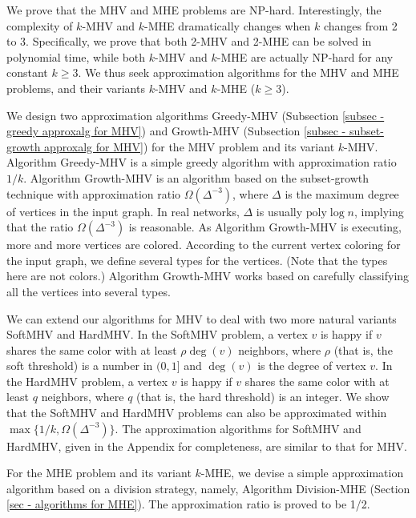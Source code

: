 \documentclass[11pt]{article}
\begin{document}
We prove that the MHV and MHE problems are NP-hard. Interestingly, the
complexity of $k$-MHV and $k$-MHE dramatically changes when $k$ changes
from 2 to 3. Specifically, we prove that both 2-MHV and 2-MHE can be solved
in polynomial time, while both $k$-MHV and $k$-MHE are actually NP-hard for
any constant $k \geq 3$. We thus seek approximation algorithms for the MHV
and MHE problems, and their variants $k$-MHV and $k$-MHE ($k \geq 3$).

We design two approximation algorithms
{\sc Greedy-MHV} (Subsection \ref{subsec - greedy approxalg for MHV}) and
{\sc Growth-MHV} (Subsection \ref{subsec - subset-growth approxalg for MHV})
for the MHV problem and its variant $k$-MHV.
Algorithm {\sc Greedy-MHV} is a simple greedy algorithm with approximation
ratio $1/k$. Algorithm {\sc Growth-MHV} is an algorithm based on the
subset-growth technique with approximation ratio $\Omega(\Delta^{-3})$,
where $\Delta$ is the maximum degree of vertices in the input graph.
In real networks, $\Delta$ is usually $\mbox{poly} \log n$, implying that
the ratio $\Omega(\Delta^{-3})$ is reasonable.
As Algorithm {\sc Growth-MHV} is executing, more and more vertices are
colored. According to the current vertex coloring for the input graph,
we define several types for the vertices. (Note that the types here are not
colors.) Algorithm {\sc Growth-MHV} works based on carefully classifying
all the vertices into several types.

We can extend our algorithms for MHV to deal with two more natural variants
SoftMHV and HardMHV.
In the SoftMHV problem, a vertex $v$ is happy if $v$ shares the same color with
at least $\rho \deg(v)$ neighbors, where $\rho$ (that is, the soft threshold)
is a number in $(0, 1]$ and $\deg(v)$ is the degree of vertex $v$.
In the HardMHV problem, a vertex $v$ is happy if $v$ shares the same color with
at least $q$ neighbors, where $q$ (that is, the hard threshold) is an integer.
We show that the SoftMHV and HardMHV problems can also be approximated within
$\max \{1/k, \Omega(\Delta^{-3})\}$.
The approximation algorithms for SoftMHV and HardMHV, given in the Appendix
for completeness, are similar to that for MHV.

For the MHE problem and its variant $k$-MHE, we devise a simple
approximation algorithm based on a division strategy, namely,
Algorithm {\sc Division-MHE} (Section \ref{sec - algorithms for MHE}).
The approximation ratio is proved to be 1/2.
\end{document}
